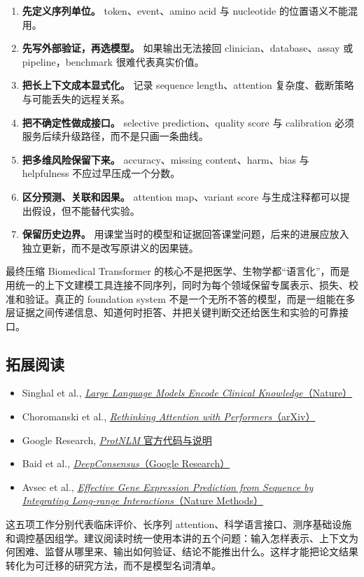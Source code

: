 \documentclass[a4paper]{article}
\begin{document}
\begin{enumerate}
  \item \textbf{先定义序列单位。} token、event、amino acid 与 nucleotide 的位置语义不能混用。
  \item \textbf{先写外部验证，再选模型。} 如果输出无法接回 clinician、database、assay 或 pipeline，benchmark 很难代表真实价值。
  \item \textbf{把长上下文成本显式化。} 记录 sequence length、attention 复杂度、截断策略与可能丢失的远程关系。
  \item \textbf{把不确定性做成接口。} selective prediction、quality score 与 calibration 必须服务后续升级路径，而不是只画一条曲线。
  \item \textbf{把多维风险保留下来。} accuracy、missing content、harm、bias 与 helpfulness 不应过早压成一个分数。
  \item \textbf{区分预测、关联和因果。} attention map、variant score 与生成注释都可以提出假设，但不能替代实验。
  \item \textbf{保留历史边界。} 用课堂当时的模型和证据回答课堂问题，后来的进展应放入独立更新，而不是改写原讲义的因果链。
\end{enumerate}

\begin{importantbox}{最终压缩}
Biomedical Transformer 的核心不是把医学、生物学都“语言化”，而是用统一的上下文建模工具连接不同序列，同时为每个领域保留专属表示、损失、校准和验证。真正的 foundation system 不是一个无所不答的模型，而是一组能在多层证据之间传递信息、知道何时拒答、并把关键判断交还给医生和实验的可靠接口。
\end{importantbox}

\subsection{拓展阅读}

\begin{itemize}
  \item Singhal et al., \href{https://www.nature.com/articles/s41586-023-06291-2}{\emph{Large Language Models Encode Clinical Knowledge}（Nature）}
  \item Choromanski et al., \href{https://arxiv.org/abs/2009.14794}{\emph{Rethinking Attention with Performers}（arXiv）}
  \item Google Research, \href{https://github.com/google-research/google-research/tree/master/protnlm}{\emph{ProtNLM} 官方代码与说明}
  \item Baid et al., \href{https://research.google/pubs/deepconsensus-improves-the-accuracy-of-sequences-with-a-gap-aware-sequence-transformer/}{\emph{DeepConsensus}（Google Research）}
  \item Avsec et al., \href{https://www.nature.com/articles/s41592-021-01252-x}{\emph{Effective Gene Expression Prediction from Sequence by Integrating Long-range Interactions}（Nature Methods）}
\end{itemize}

这五项工作分别代表临床评价、长序列 attention、科学语言接口、测序基础设施和调控基因组学。建议阅读时统一使用本讲的五个问题：输入怎样表示、上下文为何困难、监督从哪里来、输出如何验证、结论不能推出什么。这样才能把论文结果转化为可迁移的研究方法，而不是模型名词清单。
\end{document}
